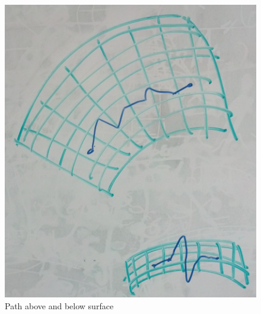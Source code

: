 \begin{figure}[ht]
\centering
\includegraphics[width=\columnwidth]{pathaboveandbelow.jpg}
\caption{Path above and below surface}
\label{pathsAboveAndBelow}
\end{figure}

